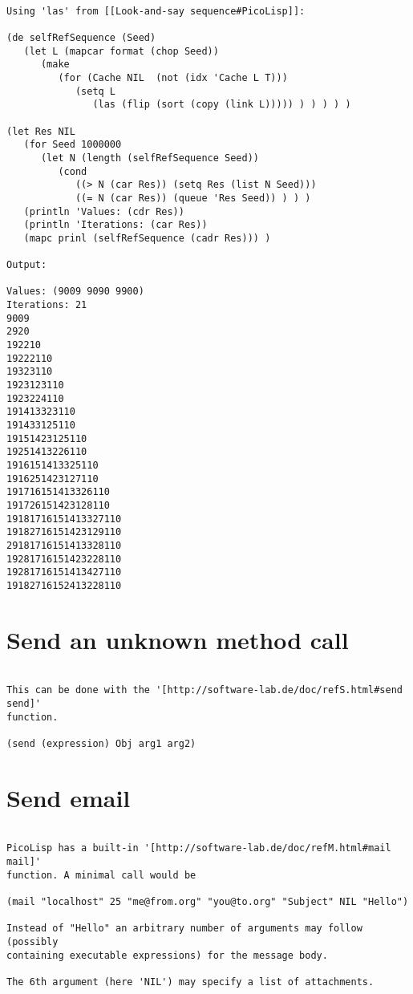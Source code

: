 \begin{verbatim}

Using 'las' from [[Look-and-say sequence#PicoLisp]]:

(de selfRefSequence (Seed)
   (let L (mapcar format (chop Seed))
      (make
         (for (Cache NIL  (not (idx 'Cache L T)))
            (setq L
               (las (flip (sort (copy (link L))))) ) ) ) ) )

(let Res NIL
   (for Seed 1000000
      (let N (length (selfRefSequence Seed))
         (cond
            ((> N (car Res)) (setq Res (list N Seed)))
            ((= N (car Res)) (queue 'Res Seed)) ) ) )
   (println 'Values: (cdr Res))
   (println 'Iterations: (car Res))
   (mapc prinl (selfRefSequence (cadr Res))) )

Output:

Values: (9009 9090 9900)
Iterations: 21
9009
2920
192210
19222110
19323110
1923123110
1923224110
191413323110
191433125110
19151423125110
19251413226110
1916151413325110
1916251423127110
191716151413326110
191726151423128110
19181716151413327110
19182716151423129110
29181716151413328110
19281716151423228110
19281716151413427110
19182716152413228110

\end{verbatim}

\section*{Send an unknown method call}

\begin{verbatim}

This can be done with the '[http://software-lab.de/doc/refS.html#send send]'
function.

(send (expression) Obj arg1 arg2)

\end{verbatim}

\section*{Send email}

\begin{verbatim}

PicoLisp has a built-in '[http://software-lab.de/doc/refM.html#mail mail]'
function. A minimal call would be

(mail "localhost" 25 "me@from.org" "you@to.org" "Subject" NIL "Hello")

Instead of "Hello" an arbitrary number of arguments may follow (possibly
containing executable expressions) for the message body.

The 6th argument (here 'NIL') may specify a list of attachments.

\end{verbatim}

